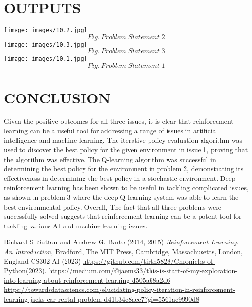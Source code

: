 \documentclass[conference]{IEEEtran}
\begin{document}
\section{OUTPUTS}
\texttt{[image: images/10.2.jpg]}
$$Fig. \; Problem \; Statement \; 2$$
\texttt{[image: images/10.3.jpg]}
$$Fig. \; Problem \; Statement \; 3$$
\texttt{[image: images/10.1.jpg]}
$$Fig. \; Problem \; Statement \; 1$$
\section{CONCLUSION}
Given the positive outcomes for all three issues, it is clear that reinforcement learning can be a useful tool for addressing a range of issues in artificial intelligence and machine learning.
The iterative policy evaluation algorithm was used to discover the best policy for the given environment in issue 1, proving that the algorithm was effective. The Q-learning algorithm was successful in determining the best policy for the environment in problem 2, demonstrating its effectiveness in determining the best policy in a stochastic environment. Deep reinforcement learning has been shown to be useful in tackling complicated issues, as shown in problem 3 where the deep Q-learning system was able to learn the best environmental policy.
Overall, The fact that all three problems were successfully solved suggests that reinforcement learning can be a potent tool for tackling various AI and machine learning issues.
\begin{thebibliography}{}
\bibitem{}
Richard S. Sutton and Andrew G. Barto (2014, 2015) \emph{Reinforcement Learning: An Introduction}, Bradford, The MIT Press, Cambridge, Massachusetts, London, England
\bibitem{}
CS302-AI (2023) \href{https://github.com/tirth5828/Chronicles-of-Python}{https://github.com/tirth5828/Chronicles-of-Python}(2023).
\bibitem{}
\href{https://medium.com/@jaems33/this-is-start-of-my-exploration-into-learning-about-reinforcement-learning-d505a68a2d6}{https://medium.com/@jaems33/this-is-start-of-my-exploration-into-learning-about-reinforcement-learning-d505a68a2d6}
\bibitem{}
\href{https://towardsdatascience.com/elucidating-policy-iteration-in-reinforcement-learning-jacks-car-rental-problem-d41b34c8aec7?gi=5561ac9990d8}{https://towardsdatascience.com/elucidating-policy-iteration-in-reinforcement-learning-jacks-car-rental-problem-d41b34c8aec7?gi=5561ac9990d8}
\end{thebibliography}
\end{document}
